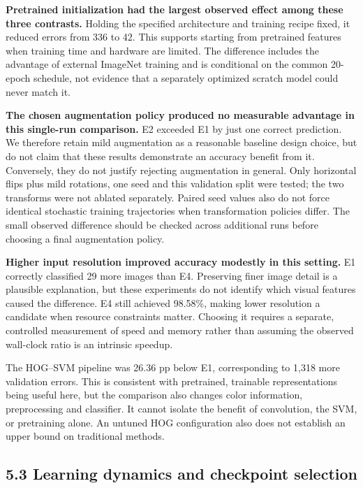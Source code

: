 \documentclass[
  10pt,
  a4paper,
]{article}
\begin{document}
\textbf{Pretrained initialization had the largest observed effect among
these three contrasts.} Holding the specified architecture and training
recipe fixed, it reduced errors from 336 to 42. This supports starting
from pretrained features when training time and hardware are limited.
The difference includes the advantage of external ImageNet training and
is conditional on the common 20-epoch schedule, not evidence that a
separately optimized scratch model could never match it.

\textbf{The chosen augmentation policy produced no measurable advantage
in this single-run comparison.} E2 exceeded E1 by just one correct
prediction. We therefore retain mild augmentation as a reasonable
baseline design choice, but do not claim that these results demonstrate
an accuracy benefit from it. Conversely, they do not justify rejecting
augmentation in general. Only horizontal flips plus mild rotations, one
seed and this validation split were tested; the two transforms were not
ablated separately. Paired seed values also do not force identical
stochastic training trajectories when transformation policies differ.
The small observed difference should be checked across additional runs
before choosing a final augmentation policy.

\textbf{Higher input resolution improved accuracy modestly in this
setting.} E1 correctly classified 29 more images than E4. Preserving
finer image detail is a plausible explanation, but these experiments do
not identify which visual features caused the difference. E4 still
achieved 98.58\%, making lower resolution a candidate when resource
constraints matter. Choosing it requires a separate, controlled
measurement of speed and memory rather than assuming the observed
wall-clock ratio is an intrinsic speedup.

The HOG--SVM pipeline was 26.36 pp below E1, corresponding to 1,318 more
validation errors. This is consistent with pretrained, trainable
representations being useful here, but the comparison also changes color
information, preprocessing and classifier. It cannot isolate the benefit
of convolution, the SVM, or pretraining alone. An untuned HOG
configuration also does not establish an upper bound on traditional
methods.

\subsection{5.3 Learning dynamics and checkpoint
selection}\label{learning-dynamics-and-checkpoint-selection}
\end{document}
